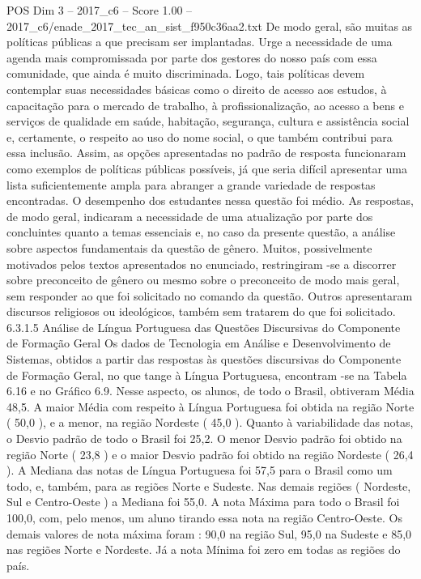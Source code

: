 \begin{textsample}{POS Dim 3 – 2017\_c6 – Score 1.00 – 2017\_c6/enade\_2017\_tec\_an\_sist\_f950c36aa2.txt}
De modo geral, são muitas as políticas públicas a que precisam ser implantadas.
Urge a necessidade de uma agenda mais compromissada por parte dos gestores do nosso país com essa comunidade, que ainda é muito discriminada.
Logo, tais políticas devem contemplar suas necessidades básicas como o direito de acesso aos estudos, à capacitação para o mercado de trabalho, à profissionalização, ao acesso a bens e serviços de qualidade em saúde, habitação, segurança, cultura e assistência social e, certamente, o respeito ao uso do nome social, o que também contribui para essa inclusão.
Assim, as opções apresentadas no padrão de resposta funcionaram como exemplos de políticas públicas possíveis, já que seria difícil apresentar uma lista suficientemente ampla para abranger a grande variedade de respostas encontradas.
O desempenho dos estudantes nessa questão foi médio.
As respostas, de modo geral, indicaram a necessidade de uma atualização por parte dos concluintes quanto a temas essenciais e, no caso da presente questão, a análise sobre aspectos fundamentais da questão de gênero.
Muitos, possivelmente motivados pelos textos apresentados no enunciado, restringiram -se a discorrer sobre preconceito de gênero ou mesmo sobre o preconceito de modo mais geral, sem responder ao que foi solicitado no comando da questão.
Outros apresentaram discursos religiosos ou ideológicos, também sem tratarem do que foi solicitado. 6.3.1.5 Análise de Língua Portuguesa das Questões Discursivas do Componente de Formação Geral Os dados de Tecnologia em Análise e Desenvolvimento de Sistemas, obtidos a partir das respostas às questões discursivas do Componente de Formação Geral, no que tange à Língua Portuguesa, encontram -se na Tabela 6.16 e no Gráfico 6.9.
Nesse aspecto, os alunos, de todo o Brasil, obtiveram Média 48,5.
A maior Média com respeito à Língua Portuguesa foi obtida na região Norte ( 50,0 ), e a menor, na região Nordeste ( 45,0 ).
Quanto à variabilidade das notas, o Desvio padrão de todo o Brasil foi 25,2.
O menor Desvio padrão foi obtido na região Norte ( 23,8 ) e o maior Desvio padrão foi obtido na região Nordeste ( 26,4 ).
A Mediana das notas de Língua Portuguesa foi 57,5 para o Brasil como um todo, e, também, para as regiões Norte e Sudeste.
Nas demais regiões ( Nordeste, Sul e Centro-Oeste ) a Mediana foi 55,0.
A nota Máxima para todo o Brasil foi 100,0, com, pelo menos, um aluno tirando essa nota na região Centro-Oeste.
Os demais valores de nota máxima foram : 90,0 na região Sul, 95,0 na Sudeste e 85,0 nas regiões Norte e Nordeste.
Já a nota Mínima foi zero em todas as regiões do país.

\end{textsample}
